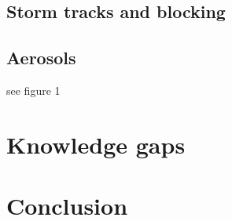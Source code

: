 \documentclass[11pt, oneside]{article}
\begin{document}
\subsection{Storm tracks and blocking}
\subsection{Aerosols}
see figure 1 \cite{vihma2016atmospheric}
\section{Knowledge gaps}
\section{Conclusion}






 {}

\end{document}
